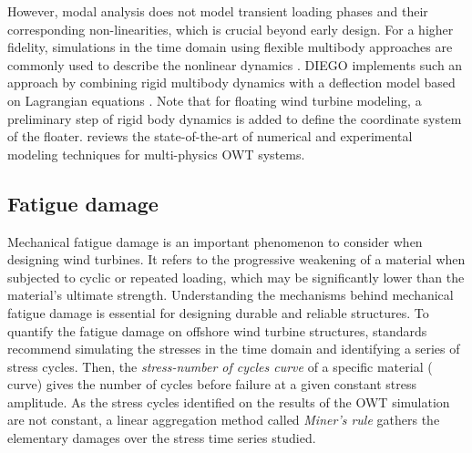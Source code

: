 However, modal analysis does not model transient loading phases and their corresponding non-linearities, which is crucial beyond early design. 
For a higher fidelity, simulations in the time domain using flexible multibody approaches are commonly used to describe the nonlinear dynamics \citep{holm_2009_multibody,alsolihat_2018_flexible_multibody}. 
DIEGO implements such an approach by combining rigid multibody dynamics with a deflection model based on Lagrangian equations \citep{milano_thesis_2021}. 
Note that for floating wind turbine modeling, a preliminary step of rigid body dynamics is added to define the coordinate system of the floater. 
\citet{otter_2022_owt_modeling_review} reviews the state-of-the-art of numerical and experimental modeling techniques for multi-physics OWT systems. 


\subsection{Fatigue damage}\label{sec:235}

Mechanical fatigue damage is an important phenomenon to consider when designing wind turbines. 
It refers to the progressive weakening of a material when subjected to cyclic or repeated loading, which may be significantly lower than the material's ultimate strength. 
Understanding the mechanisms behind mechanical fatigue damage is essential for designing durable and reliable structures. 
To quantify the fatigue damage on offshore wind turbine structures, standards \citep{dnv_fatigue_2016} recommend simulating the stresses in the time domain and identifying a series of stress cycles. 
Then, the \textit{stress-number of cycles curve} of a specific material ( curve) gives the number of cycles before failure at a given constant stress amplitude. 
As the stress cycles identified on the results of the OWT simulation are not constant, a linear aggregation method called \textit{Miner's rule} gathers the elementary damages over the stress time series studied. 


